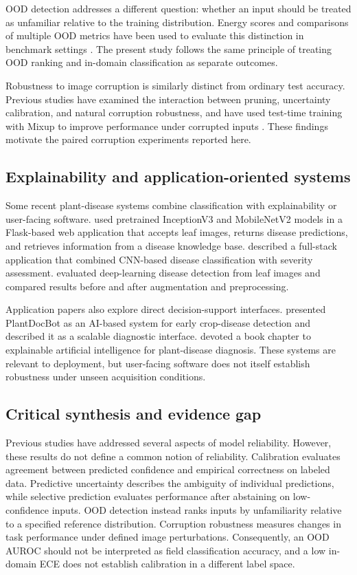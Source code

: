 \documentclass{sbc2023}%
\begin{document}
OOD detection addresses a different question: whether an input should be treated as unfamiliar relative to the training distribution. Energy scores and comparisons of multiple OOD metrics have been used to evaluate this distinction in benchmark settings \cite{r05,r42}. The present study follows the same principle of treating OOD ranking and in-domain classification as separate outcomes.

Robustness to image corruption is similarly distinct from ordinary test accuracy. Previous studies have examined the interaction between pruning, uncertainty calibration, and natural corruption robustness, and have used test-time training with Mixup to improve performance under corrupted inputs \cite{r07,r11}. These findings motivate the paired corruption experiments reported here.

\subsection{Explainability and application-oriented systems}
Some recent plant-disease systems combine classification with explainability or user-facing software. \citet{r12} used pretrained InceptionV3 and MobileNetV2 models in a Flask-based web application that accepts leaf images, returns disease predictions, and retrieves information from a disease knowledge base. \citet{r15} described a full-stack application that combined CNN-based disease classification with severity assessment. \citet{r18} evaluated deep-learning disease detection from leaf images and compared results before and after augmentation and preprocessing.

Application papers also explore direct decision-support interfaces. \citet{r19} presented PlantDocBot as an AI-based system for early crop-disease detection and described it as a scalable diagnostic interface. \citet{r36} devoted a book chapter to explainable artificial intelligence for plant-disease diagnosis. These systems are relevant to deployment, but user-facing software does not itself establish robustness under unseen acquisition conditions.
\subsection{Critical synthesis and evidence gap}
Previous studies have addressed several aspects of model reliability. However, these results do not define a common notion of reliability. Calibration evaluates agreement between predicted confidence and empirical correctness on labeled data. Predictive uncertainty describes the ambiguity of individual predictions, while selective prediction evaluates performance after abstaining on low-confidence inputs. OOD detection instead ranks inputs by unfamiliarity relative to a specified reference distribution. Corruption robustness measures changes in task performance under defined image perturbations. Consequently, an OOD AUROC should not be interpreted as field classification accuracy, and a low in-domain ECE does not establish calibration in a different label space.
\end{document}
